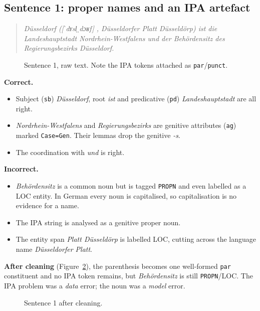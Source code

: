 \documentclass[11pt,a4paper]{article}
\newcommand{\code}[1]{\texttt{#1}}
\newcommand{\de}[1]{\textit{#1}}
\begin{document}
\subsection{Sentence 1: proper names and an IPA artefact}
\begin{quote}\de{Düsseldorf ([ˈdʏsl̩ˌdɔʁf] , Düsseldorfer Platt Düsseldörp) ist die Landeshauptstadt Nordrhein-Westfalens und der Behördensitz des Regierungsbezirks Düsseldorf.}\end{quote}
\begin{figure}[h]\centering

\caption{Sentence 1, raw text. Note the IPA tokens attached as \code{par}/\code{punct}.}\label{fig:s1}
\end{figure}
\textbf{Correct.}
\begin{itemize}
  \item Subject (\code{sb}) \de{Düsseldorf}, root \de{ist} and predicative (\code{pd}) \de{Landeshauptstadt} are all right.
  \item \de{Nordrhein-Westfalens} and \de{Regierungsbezirks} are genitive attributes (\code{ag}) marked \code{Case=Gen}. Their lemmas drop the genitive \de{-s}.
  \item The coordination with \de{und} is right.
\end{itemize}
\textbf{Incorrect.}
\begin{itemize}
  \item \de{Behördensitz} is a common noun but is tagged \code{PROPN} and even labelled as a LOC entity. In German every noun is capitalised, so capitalisation is no evidence for a name.
  \item The IPA string is analysed as a genitive proper noun.
  \item The entity span \de{Platt Düsseldörp} is labelled LOC, cutting across the language name \de{Düsseldorfer Platt}.
\end{itemize}
\textbf{After cleaning} (Figure~\ref{fig:s1c}), the parenthesis becomes one well-formed \code{par} constituent and no IPA token remains, but \de{Behördensitz} is still \code{PROPN}/LOC. The IPA problem was a \emph{data} error; the noun was a \emph{model} error.
\begin{figure}[h]\centering

\caption{Sentence 1 after cleaning.}\label{fig:s1c}
\end{figure}
\end{document}
